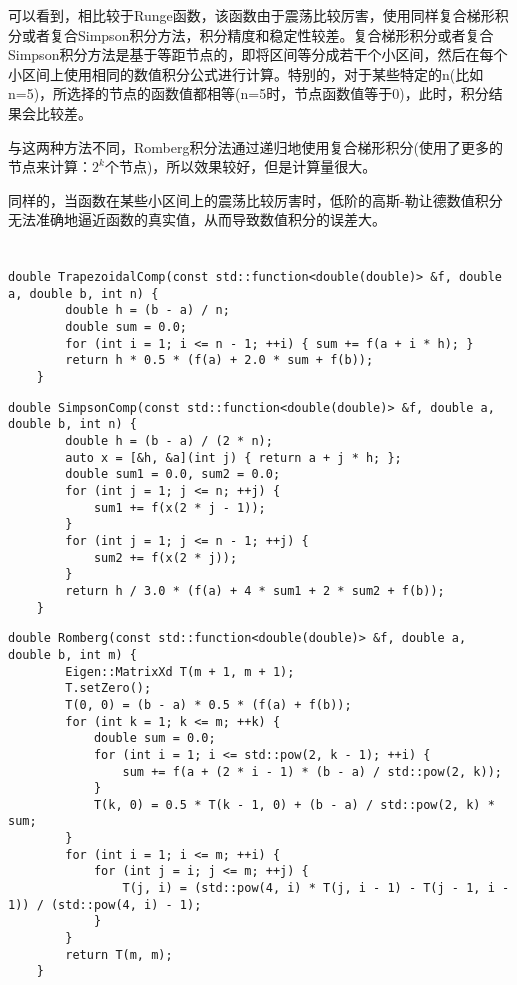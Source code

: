 \documentclass[12pt, onecolumn]{article}
\newcommand\normf{\fangsong}
\begin{document}
		
		
	可以看到，相比较于Runge函数，该函数由于震荡比较厉害，使用同样复合梯形积分或者复合Simpson积分方法，积分精度和稳定性较差。复合梯形积分或者复合Simpson积分方法是基于等距节点的，即将区间等分成若干个小区间，然后在每个小区间上使用相同的数值积分公式进行计算。特别的，对于某些特定的n(比如n=5)，所选择的节点的函数值都相等(n=5时，节点函数值等于0)，此时，积分结果会比较差。
	
	与这两种方法不同，Romberg积分法通过递归地使用复合梯形积分(使用了更多的节点来计算：$2^k$个节点)，所以效果较好，但是计算量很大。
	
	同样的，当函数在某些小区间上的震荡比较厉害时，低阶的高斯-勒让德数值积分无法准确地逼近函数的真实值，从而导致数值积分的误差大。
		
	
	\section{\normf{代码附录}}
	\begin{lstlisting}[caption=\normf 复化梯形求积]
    double TrapezoidalComp(const std::function<double(double)> &f, double a, double b, int n) {
        double h = (b - a) / n;
        double sum = 0.0;
        for (int i = 1; i <= n - 1; ++i) { sum += f(a + i * h); }
        return h * 0.5 * (f(a) + 2.0 * sum + f(b));
    }
	\end{lstlisting}
	
	\begin{lstlisting}[caption=\normf 复化Simpson求积]
    double SimpsonComp(const std::function<double(double)> &f, double a, double b, int n) {
        double h = (b - a) / (2 * n);
        auto x = [&h, &a](int j) { return a + j * h; };
        double sum1 = 0.0, sum2 = 0.0;
        for (int j = 1; j <= n; ++j) {
            sum1 += f(x(2 * j - 1));
        }
        for (int j = 1; j <= n - 1; ++j) {
            sum2 += f(x(2 * j));
        }
        return h / 3.0 * (f(a) + 4 * sum1 + 2 * sum2 + f(b));
    }
	\end{lstlisting}
	
	\begin{lstlisting}[caption=\normf Romberg求积]
    double Romberg(const std::function<double(double)> &f, double a, double b, int m) {
        Eigen::MatrixXd T(m + 1, m + 1);
        T.setZero();
        T(0, 0) = (b - a) * 0.5 * (f(a) + f(b));
        for (int k = 1; k <= m; ++k) {
            double sum = 0.0;
            for (int i = 1; i <= std::pow(2, k - 1); ++i) {
                sum += f(a + (2 * i - 1) * (b - a) / std::pow(2, k));
            }
            T(k, 0) = 0.5 * T(k - 1, 0) + (b - a) / std::pow(2, k) * sum;
        }
        for (int i = 1; i <= m; ++i) {
            for (int j = i; j <= m; ++j) {
                T(j, i) = (std::pow(4, i) * T(j, i - 1) - T(j - 1, i - 1)) / (std::pow(4, i) - 1);
            }
        }
        return T(m, m);
    }
	\end{lstlisting}
	
\end{document}
